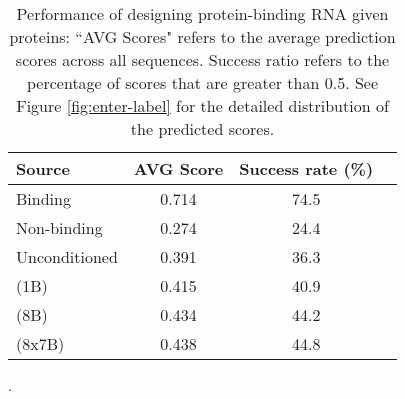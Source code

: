 \begin{table}[!h]
\centering
\begin{tabular}{lccc}
\toprule
Source          & AVG Score & Success rate (\%)\\
\midrule
Binding         & 0.714     & 74.5 \\
Non-binding     & 0.274     & 24.4 \\
Unconditioned   & 0.391     & 36.3 \\
\ourM{} (1B)    & 0.415     & 40.9 \\
\ourM{} (8B)    & 0.434     & 44.2 \\
\ourM{} (8x7B)  & 0.438     & 44.8 \\
\bottomrule
\end{tabular}
\caption{Performance of designing protein-binding RNA given proteins: ``AVG Scores" refers to the average prediction scores across all sequences. Success ratio refers to the percentage of scores that are greater than 0.5. See Figure \ref{fig:enter-label} for the detailed distribution of the predicted scores.}
\label{tab:RNA:rbp2rna}
\end{table}.
